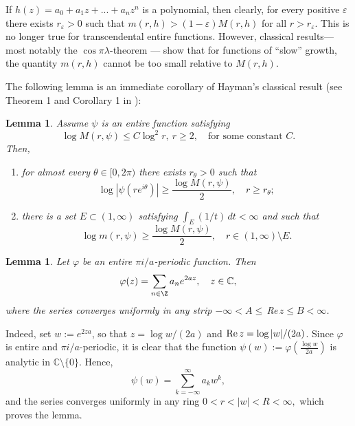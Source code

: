 \documentclass[12pt]{amsart}
\numberwithin{equation}{section}
\theoremstyle{plain}
\newtheorem{lemma}[theorem]{Lemma}
\theoremstyle{definition}
\begin{document}
If $h(z)=a_0+a_1z+...+a_nz^n$ is a polynomial, then clearly, for every positive $\varepsilon$ there exists $r_\varepsilon>0$ such that $m(r,h)>(1-\varepsilon)M(r,h)$ for all $r>r_\varepsilon.$ This is no longer true for transcendental entire functions.  However, classical results—most notably the 
$\cos\pi\lambda$-theorem — show that for functions of “slow” growth, the quantity 
$m(r,h)$ cannot be too small relative to 
$M(r,h)$. 

 The following lemma is an immediate corollary of Hayman's classical result (see Theorem 1 and Corollary 1 in  \cite{MR111839}):
\begin{lemma}\label{hayman}
    Assume $\psi$ is an entire function satisfying
    \begin{equation}\label{mrh}
        \log M(r,\psi)\leq C\log^2 r, \ r\geq 2, \quad \text{for some constant } C.
    \end{equation}
    Then, 
\begin{enumerate}
    \item[$(i)$]     
    for almost every $\theta\in [0,2\pi)$ there exists $r_\theta>0$ such that
\begin{equation}\label{h1}
\log|\psi(re^{i\theta})|\geq\frac{\log M(r,\psi)}{2},\quad r\geq r_\theta;
\end{equation}
    \item[$(ii)$] there is a set $E\subset (1,\infty)$ satisfying $\int_E (1/t)\,dt<\infty$ and such that \begin{equation}\label{mrh1}
    \log m(r,\psi)\geq \frac{\log M(r,\psi)}{2},\quad r\in (1,\infty)\setminus E.
\end{equation}
\end{enumerate}
\end{lemma}

\begin{lemma}
    Let $\varphi$ be an entire $\pi i/a$-periodic function. Then 
    $$\varphi(z)=\sum_{n\in\Z}a_ne^{2az},\quad z\in\mathbb C,$$where the series converges uniformly in any strip $-\infty<A\leq\,${\rm Re}$\,z\leq B<\infty$.
\end{lemma}

Indeed, set $w:=e^{2za}$, so that $z=\log w/(2a)$ and ${\rm Re \,}z=\log |w|/(2a)$. Since $\varphi$ is entire and $\pi i /a$-periodic, it is clear that the function $\psi(w):=\varphi(\frac{\log w}{2a})$ is analytic in $\mathbb C\setminus\{0\}$. Hence,
 $$\psi(w)=\sum_{k=-\infty}^\infty a_k w^k,$$ and the series converges uniformly in any ring $0<r<|w|<R<\infty,$ which proves the lemma.      
\end{document}
